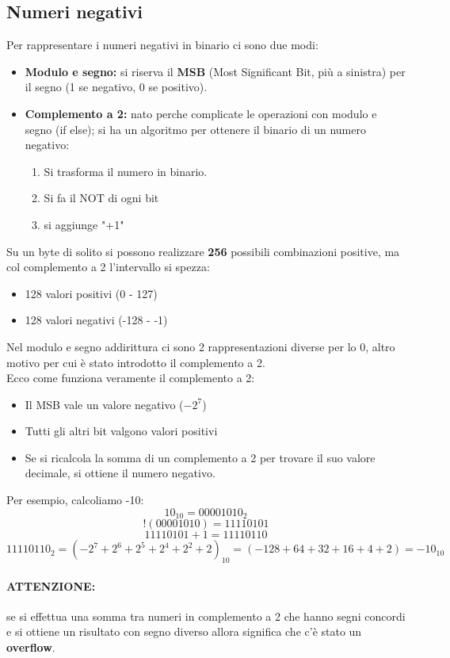 \documentclass[12pt,a4paper]{article}
\begin{document}
\subsection{Numeri negativi}
Per rappresentare i numeri negativi in binario ci sono due modi:
\begin{itemize}
    \item \textbf{Modulo e segno:} si riserva il \textbf{MSB} (Most Significant Bit, più a sinistra) per il segno (1 se negativo, 0 se positivo).
    \item \textbf{Complemento a 2:} nato perche complicate le operazioni con modulo e segno (if else); si ha un algoritmo per ottenere il binario di un numero negativo:
    \begin{enumerate}
        \item Si trasforma il numero in binario.
        \item Si fa il NOT di ogni bit
        \item si aggiunge "+1"
    \end{enumerate}
\end{itemize}
Su un byte di solito si possono realizzare \textbf{256} possibili combinazioni positive, ma col complemento a 2 l'intervallo si spezza:
\begin{itemize}
    \item 128 valori positivi (0 - 127)
    \item 128 valori negativi (-128 - -1)
\end{itemize}
Nel modulo e segno addirittura ci sono 2 rappresentazioni diverse per lo 0, altro motivo per cui è stato introdotto il complemento a 2.\\
Ecco come funziona veramente il complemento a 2:
\begin{itemize}
    \item Il MSB vale un valore negativo ($-2^7$)
    \item Tutti gli altri bit valgono valori positivi
    \item Se si ricalcola la somma di un complemento a 2 per trovare il suo valore decimale, si ottiene il numero negativo.
\end{itemize}
Per esempio, calcoliamo -10:
\[
10_{10} = 0000 1010_2
\]
\[
!(0000 1010) = 1111 0101
\]
\[
1111 0101 + 1 = 1111 0110
\]
\[
1111 0110_2 = (-2^7 + 2^6 + 2^5 +2^4 + 2^2 + 2)_{10} = (-128 + 64 + 32 + 16 + 4 + 2) = -10_{10}
\]
\paragraph{ATTENZIONE:} se si effettua una somma tra numeri in complemento a 2 che hanno segni concordi e si ottiene un risultato con segno diverso allora significa che c'è stato un \textbf{overflow}.
\end{document}
